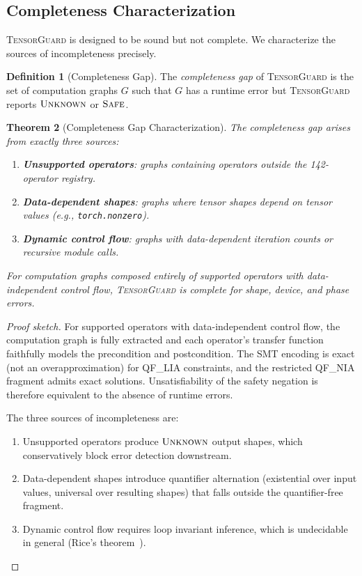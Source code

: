 \documentclass[10pt]{article}
\newcommand{\tguard}{\textsc{TensorGuard}}
\theoremstyle{plain}
\newtheorem{theorem}{Theorem}[section]
\theoremstyle{definition}
\newtheorem{definition}[theorem]{Definition}
\theoremstyle{remark}
\begin{document}
\subsection{Completeness Characterization}

\tguard{} is designed to be sound but not complete.  We characterize
the sources of incompleteness precisely.

\begin{definition}[Completeness Gap]
The \emph{completeness gap} of \tguard{} is the set of computation
graphs $G$ such that $G$ has a runtime error but \tguard{} reports
$\textsc{Unknown}$ or $\textsc{Safe}$.
\end{definition}

\begin{theorem}[Completeness Gap Characterization]\label{thm:gap}
The completeness gap arises from exactly three sources:
\begin{enumerate}[nosep]
  \item \textbf{Unsupported operators}: graphs containing operators
    outside the 142-operator registry.
  \item \textbf{Data-dependent shapes}: graphs where tensor shapes
    depend on tensor \emph{values} (e.g., \texttt{torch.nonzero}).
  \item \textbf{Dynamic control flow}: graphs with data-dependent
    iteration counts or recursive module calls.
\end{enumerate}
For computation graphs composed entirely of supported operators
with data-independent control flow, \tguard{} is complete for
shape, device, and phase errors.
\end{theorem}

\begin{proof}[Proof sketch]
For supported operators with data-independent control flow, the
computation graph is fully extracted and each operator's transfer
function faithfully models the precondition and postcondition.  The
SMT encoding is exact (not an overapproximation) for QF\_LIA
constraints, and the restricted QF\_NIA fragment admits exact
solutions.  Unsatisfiability of the safety negation is therefore
equivalent to the absence of runtime errors.

The three sources of incompleteness are:
\begin{enumerate}[nosep]
  \item Unsupported operators produce $\textsc{Unknown}$ output
    shapes, which conservatively block error detection downstream.
  \item Data-dependent shapes introduce quantifier alternation
    (existential over input values, universal over resulting shapes)
    that falls outside the quantifier-free fragment.
  \item Dynamic control flow requires loop invariant inference,
    which is undecidable in general (Rice's theorem~\cite{rice53}).
\end{enumerate}
\end{proof}
\end{document}
